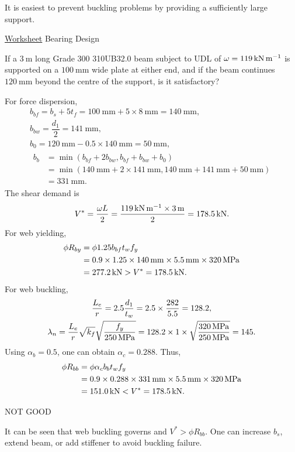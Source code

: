 It is easiest to prevent buckling problems by providing a sufficiently large support.
\begin{exmp}\href{run:./WORKSHEET/CH05/EX5.BUDL.sm}{Worksheet} Bearing Design

If a $\SI{3}{\meter}$ long Grade 300 310UB32.0 beam subject to UDL of $\omega=\SI{119}{\kilo\newton\per\meter}$ is supported on a $\SI{100}{\mm}$ wide plate at either end, and if the beam continues $\SI{120}{\mm}$ beyond the centre of the support, is it satisfactory?
\end{exmp}
\begin{solution}
\begin{figure}[H]

\end{figure}
For force dispersion,
\begin{gather*}
b_{bf}=b_s+5t_f=\SI{100}{\mm}+5\times\SI{8}{\mm}=\SI{140}{\mm},\\
b_{bw}=\dfrac{d_1}{2}=\SI{141}{\mm},\\
b_0=\SI{120}{\mm}-0.5\times\SI{140}{\mm}=\SI{50}{\mm},\\
\begin{split}
b_b&=\min\left(b_{bf}+2b_{bw},b_{bf}+b_{bw}+b_0\right)\\
&=\min\left(\SI{140}{\mm}+2\times\SI{141}{\mm},\SI{140}{\mm}+\SI{141}{\mm}+\SI{50}{\mm}\right)\\
&=\SI{331}{\mm}.
\end{split}
\end{gather*}
The shear demand is
\begin{gather*}
V^*=\dfrac{\omega{}L}{2}=\dfrac{\SI{119}{\kilo\newton\per\meter}\times\SI{3}{\meter}}{2}=\SI{178.5}{\kilo\newton}.
\end{gather*}
For web yielding,
\begin{align*}
\phi{}R_{by}&=\phi{}1.25b_{bf}t_wf_y\\
&=0.9\times1.25\times\SI{140}{\milli\meter}\times\SI{5.5}{\milli\meter}\times\SI{320}{\mega\pascal}\\
&=\SI{277.2}{\kilo\newton}>V^*=\SI{178.5}{\kilo\newton}.
\end{align*}
For web buckling,
\begin{gather*}
\dfrac{L_e}{r}=2.5\dfrac{d_1}{t_w}=2.5\times\dfrac{282}{5.5}=128.2,\\
\lambda_n=\dfrac{L_e}{r}\sqrt{k_f}\sqrt{\dfrac{f_y}{\SI{250}{\mega\pascal}}}=128.2\times1\times\sqrt{\dfrac{\SI{320}{\mega\pascal}}{\SI{250}{\mega\pascal}}}=145.
\end{gather*}
Using $\alpha_b=0.5$, one can obtain $\alpha_c=0.288$.
Thus,
\begin{align*}
\phi{}R_{bb}&=\phi{}\alpha_cb_bt_wf_y\\
&=0.9\times0.288\times\SI{331}{\milli\meter}\times\SI{5.5}{\milli\meter}\times\SI{320}{\mega\pascal}\\
&=\SI{151.0}{\kilo\newton}<V^*=\SI{178.5}{\kilo\newton}.
\end{align*}
\begin{flushright}
NOT GOOD
\end{flushright}
It can be seen that web buckling governs and $V^*>\phi{}R_{bb}$.
One can increase $b_s$, extend beam, or add stiffener to avoid buckling failure.
\end{solution}
